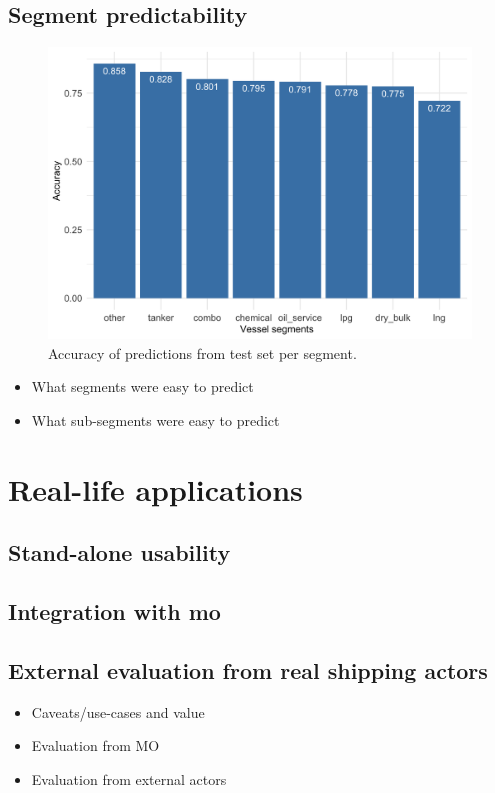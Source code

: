 \subsection{Segment predictability}

\begin{figure}[htbp]
    \centering
    \includegraphics[width=1.0\textwidth]{figures/results/segment_accuracy}
    \caption{Accuracy of predictions from test set per segment.}
    \label{fig:segment_accuracy}
\end{figure}

\begin{itemize}
    \item What segments were easy to predict
    \item What sub-segments were easy to predict
\end{itemize}

\section{Real-life applications}

\subsection{Stand-alone usability}

\subsection{Integration with \acrfull{mo}}

\subsection{External evaluation from real shipping actors}

\begin{itemize}
    \item Caveats/use-cases and value
    \item Evaluation from MO
    \item Evaluation from external actors
\end{itemize}
